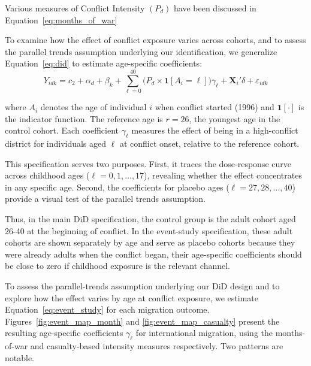 Various measures of Conflict Intensity $(P_d)$ have been discussed in Equation~\ref{eq:months_of_war} 


To examine how the effect of conflict exposure varies across cohorts, and to assess the parallel trends assumption underlying our identification, we generalize Equation~\ref{eq:did} to estimate age-specific coefficients:
\begin{equation}
Y_{idk} = c_{2} + \alpha_{d} + \beta_{k} + \sum_{\ell = 0}^{40}\bigl(P_d \times \mathbf{1}[A_i = \ell]\bigr)\gamma_{\ell} + \mathbf{X}_i' \delta + \varepsilon_{idk}
\label{eq:event_study}
\end{equation}



where $A_i$ denotes the age of individual $i$ when conflict started (1996) and $\mathbf{1}[\cdot]$ is the indicator function. The reference age is $r = 26$, the youngest age in the control cohort. Each coefficient $\gamma_{\ell}$ measures the effect of being in a high-conflict district for individuals aged $\ell$ at conflict onset, relative to the reference cohort.

This specification serves two purposes. First, it traces the dose-response curve across childhood ages ($\ell = 0, 1, \ldots, 17$), revealing whether the effect concentrates in any specific age. Second, the coefficients for placebo ages ($\ell = 27, 28, \ldots, 40$) provide a visual test of the parallel trends assumption.

Thus, in the main DiD specification, the control group is the adult cohort aged 26-40 at the beginning of conflict. In the event-study specification, these adult cohorts are shown separately by age and serve as placebo cohorts because they were already adults when the conflict began, their age-specific coefficients should be close to zero if childhood exposure is the relevant channel.

To assess the parallel-trends assumption underlying our DiD design and to 
explore how the effect varies by age at conflict exposure, we estimate 
Equation~\ref{eq:event_study} for each migration outcome. 
Figures~\ref{fig:event_map_month} and 
\ref{fig:event_map_casualty} present the resulting age-specific 
coefficients $\gamma_\ell$ for international migration, using the months-of-war 
and casualty-based intensity measures respectively. Two patterns are notable.



